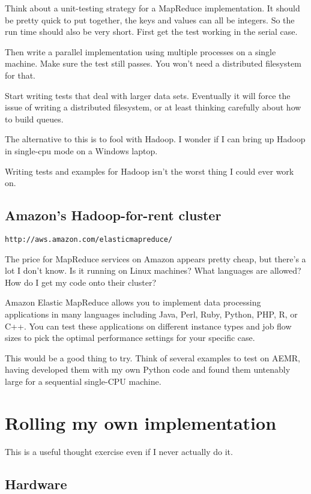 \documentclass[11pt]{article}
\begin{document}
Think about a unit-testing strategy for a MapReduce implementation. It
should be pretty quick to put together, the keys and values can all be
integers. So the run time should also be very short. First get the
test working in the serial case.

Then write a parallel implementation using multiple processes on a
single machine. Make sure the test still passes. You won't need a
distributed filesystem for that.

Start writing tests that deal with larger data sets. Eventually it
will force the issue of writing a distributed filesystem, or at least
thinking carefully about how to build queues.

The alternative to this is to fool with Hadoop. I wonder if I can
bring up Hadoop in single-cpu mode on a Windows laptop.

Writing tests and examples for Hadoop isn't the worst thing I could
ever work on.

\subsection{Amazon's Hadoop-for-rent cluster}

{\tt http://aws.amazon.com/elasticmapreduce/}

The price for MapReduce services on Amazon appears pretty cheap, but
there's a lot I don't know. Is it running on Linux machines? What
languages are allowed? How do I get my code onto their cluster?

Amazon Elastic MapReduce allows you to implement data processing
applications in many languages including Java, Perl, Ruby, Python,
PHP, R, or C++. You can test these applications on different instance
types and job flow sizes to pick the optimal performance settings for
your specific case.

This would be a good thing to try. Think of several examples to test
on AEMR, having developed them with my own Python code and found them
untenably large for a sequential single-CPU machine.

\section{Rolling my own implementation}

This is a useful thought exercise even if I never actually do it.

\subsection{Hardware}
\end{document}
